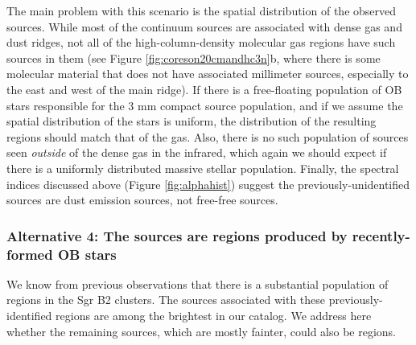 \documentclass[twocolumn]{aastex61}
\begin{document}
The main problem with this scenario is the spatial distribution of the observed
sources.  While most of the continuum sources are associated with dense gas and
dust ridges, not all of the high-column-density molecular gas regions have such
sources in them (see Figure \ref{fig:coreson20cmandhc3n}b, where there is some
molecular material that does not have associated millimeter sources,
especially to the east and west of the main ridge).  If there is a
free-floating population of OB stars responsible for the 3 mm compact source
population, and if we assume the spatial distribution of the stars is uniform,
the distribution of the resulting \hii regions should match that of the gas.
Also, there is no such population of sources seen \emph{outside} of the dense
gas in the infrared,
which again we should expect if there is a uniformly distributed massive stellar
population.  Finally, the spectral indices discussed above (Figure
\ref{fig:alphahist}) suggest the previously-unidentified sources are dust
emission sources, not free-free sources.



\subsubsection{Alternative 4: The sources are \hii regions produced by
recently-formed OB stars}
\label{sec:theyarehiiregions}

We know from previous observations
\citep[e.g.,][]{Mehringer1995b,De-Pree1996a,De-Pree2015a} that there is a
substantial population of \hii regions in the Sgr B2 clusters.  The \nhii
sources associated with these previously-identified \hii regions are among the
brightest in our catalog.  We address here whether the remaining  sources,
which are mostly fainter, could also be \hii regions.
\end{document}
